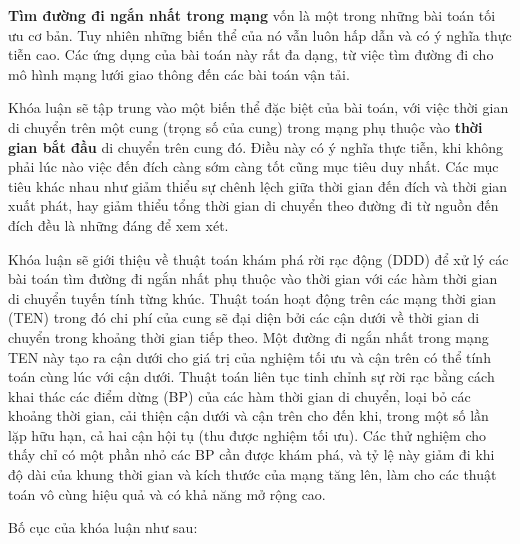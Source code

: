 \documentclass[fontsize=14pt,DIV=15pt,twoside=false]{scrbook}
\begin{document}

\textbf{Tìm đường đi ngắn nhất trong mạng} vốn là một trong những bài toán tối ưu cơ bản. Tuy nhiên những biến thể  của nó vẫn luôn hấp dẫn và có ý nghĩa thực tiễn cao. Các ứng dụng của bài toán này rất đa dạng, từ việc tìm đường đi cho mô hình mạng lưới giao thông đến các bài toán vận tải. 

Khóa luận sẽ tập trung vào một biến thể đặc biệt của bài toán, với việc thời gian di chuyển trên một cung (trọng số của cung) trong mạng phụ thuộc vào \textbf{thời gian bắt đầu} di chuyển trên cung đó. Điều này có ý nghĩa thực tiễn, khi không phải lúc nào việc đến đích càng sớm càng tốt cũng mục tiêu duy nhất. Các mục tiêu khác nhau như giảm thiểu sự chênh lệch giữa thời gian đến đích và thời gian xuất phát, hay giảm thiểu tổng thời gian di chuyển theo đường đi từ nguồn đến đích đều là những đáng để xem xét.
    
Khóa luận sẽ giới thiệu về thuật toán khám phá rời rạc động (DDD) để xử lý các bài toán tìm đường đi ngắn nhất phụ thuộc vào thời gian với các hàm thời gian di chuyển tuyến tính từng khúc. Thuật toán hoạt động trên các mạng thời gian (TEN) trong đó chi phí của cung sẽ đại diện bởi các cận dưới về thời gian di chuyển trong khoảng thời gian tiếp theo. Một đường đi ngắn nhất trong mạng TEN này tạo ra cận dưới cho giá trị của nghiệm tối ưu và cận trên có thể tính toán cùng lúc với cận dưới. Thuật toán liên tục tinh chỉnh sự rời rạc bằng cách khai thác các điểm dừng (BP) của các hàm thời gian di chuyển, loại bỏ các khoảng thời gian, cải thiện cận dưới và cận trên cho đến khi, trong một số lần lặp hữu hạn, cả hai cận hội tụ (thu được nghiệm tối ưu). Các thử nghiệm cho thấy chỉ có một phần nhỏ các BP cần được khám phá, và tỷ lệ này giảm đi khi độ dài của khung thời gian và kích thước của mạng tăng lên, làm cho các thuật toán vô cùng hiệu quả và có khả năng mở rộng cao.

Bố cục của khóa luận như sau:
\end{document}

